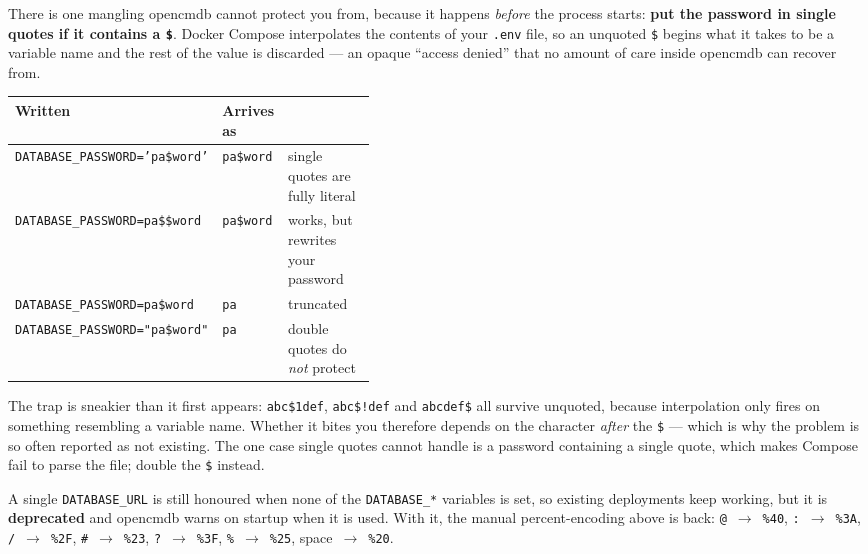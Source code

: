 \documentclass[11pt,oneside,listof=totoc,bibliography=totoc]{scrreprt}
\begin{document}
\begin{warning}
There is one mangling opencmdb cannot protect you from, because it happens \emph{before} the
process starts: \textbf{put the password in single quotes if it contains a \texttt{\$}}. Docker
Compose interpolates the contents of your \texttt{.env} file, so an unquoted \texttt{\$} begins
what it takes to be a variable name and the rest of the value is discarded --- an opaque
``access denied'' that no amount of care inside opencmdb can recover from.

\medskip
\begin{tabular}{@{}llp{0.42\linewidth}@{}}
\toprule
\textbf{Written} & \textbf{Arrives as} & \\
\midrule
\texttt{DATABASE\_PASSWORD='pa\$word'} & \texttt{pa\$word} & single quotes are fully literal \\
\texttt{DATABASE\_PASSWORD=pa\$\$word} & \texttt{pa\$word} & works, but rewrites your password \\
\texttt{DATABASE\_PASSWORD=pa\$word}  & \texttt{pa} & truncated \\
\texttt{DATABASE\_PASSWORD="pa\$word"} & \texttt{pa} & double quotes do \emph{not} protect \\
\bottomrule
\end{tabular}

\medskip
The trap is sneakier than it first appears: \texttt{abc\$1def}, \texttt{abc\$!def} and
\texttt{abcdef\$} all survive unquoted, because interpolation only fires on something resembling
a variable name. Whether it bites you therefore depends on the character \emph{after} the
\texttt{\$} --- which is why the problem is so often reported as not existing. The one case
single quotes cannot handle is a password containing a single quote, which makes Compose fail to
parse the file; double the \texttt{\$} instead.
\end{warning}

\begin{note}
A single \texttt{DATABASE\_URL} is still honoured when none of the \texttt{DATABASE\_*}
variables is set, so existing deployments keep working, but it is \textbf{deprecated} and
opencmdb warns on startup when it is used. With it, the manual percent-encoding above is back:
\texttt{@}~$\rightarrow$~\texttt{\%40}, \texttt{:}~$\rightarrow$~\texttt{\%3A},
\texttt{/}~$\rightarrow$~\texttt{\%2F}, \texttt{\#}~$\rightarrow$~\texttt{\%23},
\texttt{?}~$\rightarrow$~\texttt{\%3F}, \texttt{\%}~$\rightarrow$~\texttt{\%25},
space~$\rightarrow$~\texttt{\%20}.
\end{note}
\end{document}
